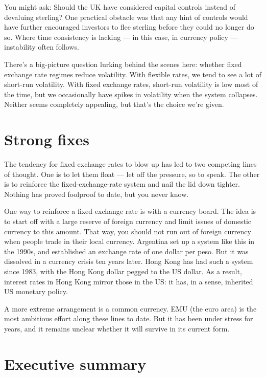 You might ask: Should the UK have considered capital controls instead of
devaluing sterling? One practical obstacle was that any hint of controls
would have further encouraged investors to flee sterling
before they could no longer do so. Where time consistency is lacking --- in this case, in currency policy --- instability often follows.

There's a big-picture question lurking behind the scenes here:
whether fixed exchange rate regimes reduce volatility.
With flexible rates, we tend to see a lot of short-run volatility.
With fixed exchange rates, short-run volatility is low most of the time,
but we occasionally have spikes in volatility when the system collapses.
Neither seems completely appealing, but that's the choice we're given.


\section{Strong fixes}

The tendency for fixed exchange rates to blow up has led to two
competing lines of thought.
One is to let them float --- let off the pressure, so to speak.
The other is to reinforce the fixed-exchange-rate system and nail the lid down tighter.
Nothing has proved foolproof to date, but you never know.

One way to reinforce a fixed exchange rate is with a currency board.
The idea is to start off with a large reserve of foreign currency
and limit issues of domestic currency to this amount.
That way, you should not run out of foreign currency when people trade
in their local currency.
Argentina set up a system like this in the 1990s, and established
an exchange rate of one dollar per peso.
But it was dissolved in a currency crisis ten years later.
Hong Kong has had such a system since 1983, with the Hong Kong dollar
pegged to the US dollar.
As a result, interest rates in Hong Kong mirror those in the US:
it has, in a sense, inherited US monetary policy.


A more extreme arrangement is a common currency.
EMU (the euro area) is the most ambitious effort along these lines to date.
But it has been under stress for years, and it remains unclear whether
it will survive in its current form.


\section*{Executive summary}

